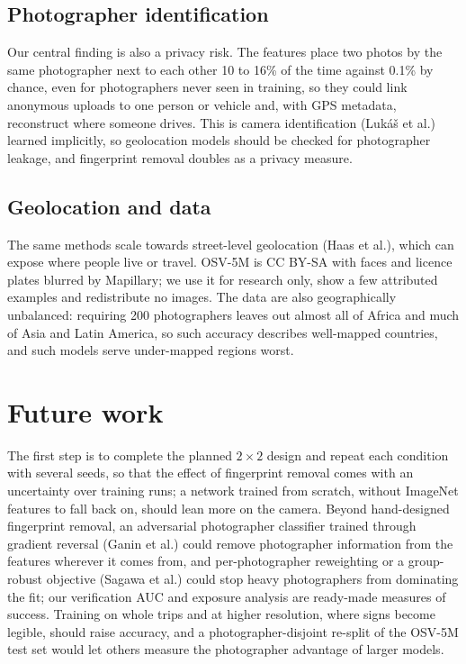 \documentclass[11pt]{article}
\begin{document}
\subsection{Photographer identification}
Our central finding is also a privacy risk. The features place two photos by the same photographer next to
each other 10 to 16\% of the time against 0.1\% by chance, even for photographers never seen in training,
so they could link anonymous uploads to one person or vehicle and, with GPS metadata, reconstruct where someone drives. This is camera identification (Luk\'a\v{s} et al.) learned implicitly, so geolocation models should be checked for photographer leakage, and fingerprint removal doubles as a privacy measure.

\subsection{Geolocation and data}
The same methods scale towards street-level geolocation (Haas et al.), which can expose where people live
or travel. OSV-5M is CC BY-SA with faces and licence plates blurred by Mapillary; we use it for research
only, show a few attributed examples and redistribute no images. The data are also geographically unbalanced: requiring 200 photographers leaves out almost all of Africa and much of Asia and Latin America, so such accuracy describes well-mapped countries, and such models serve under-mapped regions worst.

\section{Future work}
The first step is to complete the planned $2\times2$ design and repeat each condition with several seeds,
so that the effect of fingerprint removal comes with an uncertainty over training runs; a network trained
from scratch, without ImageNet features to fall back on, should lean more on the camera. Beyond
hand-designed fingerprint removal, an adversarial photographer classifier trained through gradient reversal
(Ganin et al.) could remove photographer information from the features wherever it comes from, and
per-photographer reweighting or a group-robust objective (Sagawa et al.) could stop heavy photographers from
dominating the fit; our verification AUC and exposure analysis are ready-made measures of success. Training on whole trips and at higher resolution, where signs become legible, should raise accuracy, and a photographer-disjoint re-split of the OSV-5M test set would let others measure the photographer advantage of larger models.
\end{document}
